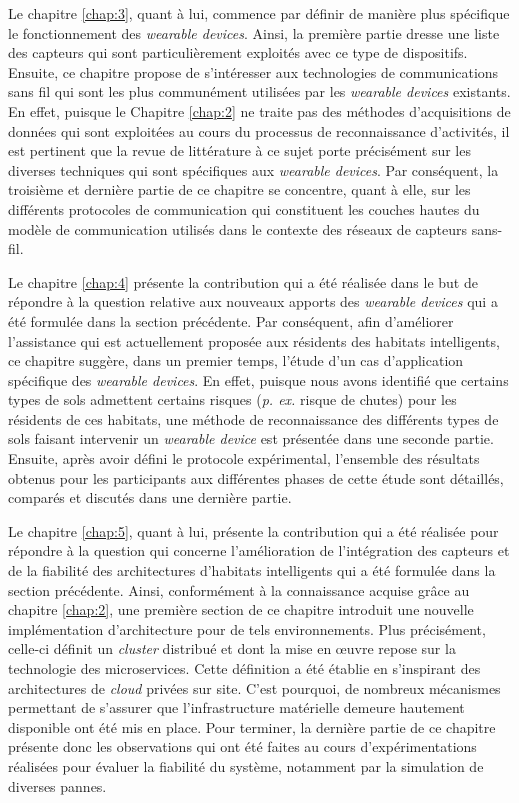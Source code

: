 {{Le chapitre \ref{chap:3}, quant à lui, commence par définir de manière plus spécifique le fonctionnement des \textit{wearable devices}. Ainsi, la première partie dresse une liste des capteurs qui sont particulièrement exploités avec ce type de dispositifs. Ensuite, ce chapitre propose de s'intéresser aux technologies de communications sans fil qui sont les plus communément utilisées par les \textit{wearable devices} existants. En effet, puisque le Chapitre \ref{chap:2} ne traite pas des méthodes d'acquisitions de données qui sont exploitées au cours du processus de reconnaissance d'activités, il est pertinent que la revue de littérature à ce sujet porte précisément sur les diverses techniques qui sont spécifiques aux \textit{wearable devices}. Par conséquent, la troisième et dernière partie de ce chapitre se concentre, quant à elle, sur les différents protocoles de communication qui constituent les couches hautes du modèle de communication utilisés dans le contexte des réseaux de capteurs sans-fil.

Le chapitre \ref{chap:4} présente la contribution qui a été réalisée dans le but de répondre à la question relative aux nouveaux apports des \textit{wearable devices} qui a été formulée dans la section précédente. Par conséquent, afin d'améliorer l'assistance qui est actuellement proposée aux résidents des habitats intelligents, ce chapitre suggère, dans un premier temps, l'étude d'un cas d'application spécifique des \textit{wearable devices}. En effet, puisque nous avons identifié que certains types de sols admettent certains risques (\textit{p. ex.} risque de chutes) pour les résidents de ces habitats, une méthode de reconnaissance des différents types de sols faisant intervenir un \textit{wearable device} est présentée dans une seconde partie. Ensuite, après avoir défini le protocole expérimental, l'ensemble des résultats obtenus pour les participants aux différentes phases de cette étude sont détaillés, comparés et discutés dans une dernière partie.

Le chapitre \ref{chap:5}, quant à lui, présente la contribution qui a été réalisée pour répondre à la question qui concerne l'amélioration de l'intégration des capteurs et de la fiabilité des architectures d'habitats intelligents qui a été formulée dans la section précédente. Ainsi, conformément à la connaissance acquise grâce au chapitre \ref{chap:2}, une première section de ce chapitre introduit une nouvelle implémentation d'architecture pour de tels environnements. Plus précisément, celle-ci définit un \textit{cluster} distribué et dont la mise en \oe{}uvre repose sur la technologie des microservices. Cette définition a été établie en s'inspirant des architectures de \textit{cloud} privées sur site. C'est pourquoi, de nombreux mécanismes permettant de s'assurer que l'infrastructure matérielle demeure hautement disponible ont été mis en place. Pour terminer, la dernière partie de ce chapitre présente donc les observations qui ont été faites au cours d'expérimentations réalisées pour évaluer la fiabilité du système, notamment par la simulation de diverses pannes.

}}
